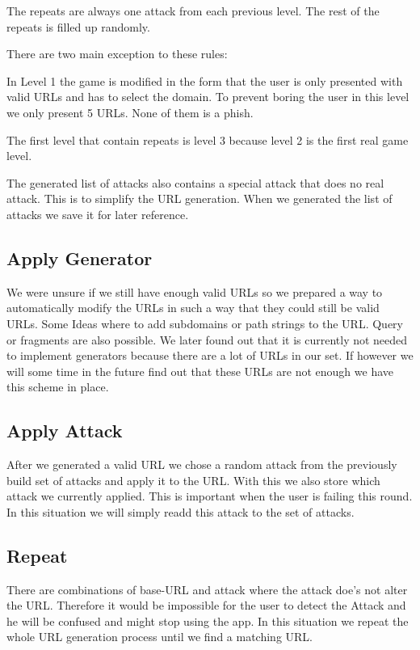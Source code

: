 The repeats are always one attack from each previous level. The rest of the repeats is filled up randomly.

There are two main exception to these rules:
\begin{description}[leftmargin=0cm]
\item[Level 1] In Level 1 the game is modified in the form that the user is only presented with valid URLs and has to select the domain.
To prevent boring the user in this level we only present 5 URLs.
None of them is a phish.
\item[Level 1+2] The first level that contain repeats is level 3 because level 2 is the first real game level.
\end{description}

The generated list of attacks also contains a special attack that does no real attack. This is to simplify the URL generation. When we generated the list of attacks we save it for later reference.
\subsection{Apply Generator}
We were unsure if we still have enough valid URLs so we prepared a way to automatically modify the URLs in such a way that they could still be valid URLs. Some Ideas where to add subdomains or path strings to the URL. Query or fragments are also possible. We later found out that it is currently not needed to implement generators because there are a lot of URLs in our set. If however we will some time in the future find out that these URLs are not enough we have this scheme in place.
\subsection{Apply Attack}
After we generated a valid URL we chose a random attack from the previously build set of attacks and apply it to the URL. With this we also store which attack we currently applied. This is important when the user is failing this round. In this situation we will simply readd this attack to the set of attacks.
\subsection{Repeat}
There are combinations of base-URL and attack where the attack doe's not alter the URL.
Therefore it would be impossible for the user to detect the Attack and he will be confused and might stop using the app.
In this situation we repeat the whole URL generation process until we find a matching URL.

